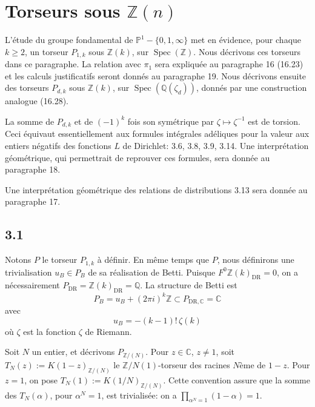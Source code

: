 \documentclass[12pt,a4paper]{article}
\theoremstyle{plain}
\theoremstyle{definition}
\theoremstyle{remark}
\DeclareMathOperator{\Spec}{Spec}
\providecommand{\Spec}{\operatorname{Spec}}
\providecommand{\DR}{\mathrm{DR}}
\begin{document}
\section{Torseurs sous $\mathbb{Z}(n)$}\label{sec:3}

L'\'etude du groupe fondamental de $\mathbb{P}^1 - \{0, 1, \infty\}$ met en \'evidence,
pour chaque $k \geq 2$, un torseur $P_{1,k}$ sous $\mathbb{Z}(k)$, sur
$\Spec(\mathbb{Z})$. Nous d\'ecrivons ces torseurs dans ce paragraphe. La relation avec
$\pi_1$ sera expliqu\'ee au paragraphe 16 (16.23) et les calculs justificatifs seront
donn\'es au paragraphe 19. Nous d\'ecrivons ensuite des torseurs $P_{d,k}$ sous
$\mathbb{Z}(k)$, sur $\Spec(\mathbb{Q}(\zeta_d))$, donn\'es par une construction analogue
(16.28).

La somme de $P_{d,k}$ et de $(-1)^k$ fois son sym\'etrique par $\zeta \mapsto \zeta^{-1}$
est de torsion. Ceci \'equivaut essentiellement aux formules int\'egrales ad\'eliques
pour la valeur aux entiers n\'egatifs des fonctions $L$ de Dirichlet: 3.6, 3.8, 3.9,
3.14. Une interpr\'etation g\'eom\'etrique, qui permettrait de reprouver ces formules,
sera donn\'ee au paragraphe 18.

Une interpr\'etation g\'eom\'etrique des relations de distributions 3.13 sera donn\'ee
au paragraphe 17.

\subsection*{3.1}

Notons $P$ le torseur $P_{1,k}$ \`a d\'efinir. En m\^eme temps que $P$, nous
d\'efinirons une trivialisation $u_B \in P_B$ de sa r\'ealisation de Betti. Puisque
$F^0 \mathbb{Z}(k)_{\DR} = 0$, on a n\'ecessairement $P_{\DR} = \mathbb{Z}(k)_{\DR} =
\mathbb{Q}$. La structure de Betti est
\begin{equation}\label{eq:3.1.1}
P_B = u_B + (2\pi i)^k \mathbb{Z} \subset P_{\DR,\mathbb{C}} = \mathbb{C}
\end{equation}
avec
\begin{equation*}
u_B = -(k-1)!\, \zeta(k)
\end{equation*}
o\`u $\zeta$ est la fonction $\zeta$ de Riemann.

Soit $N$ un entier, et d\'ecrivons $P_{\mathbb{Z}/(N)}$. Pour $z \in \mathbb{C}$,
$z \neq 1$, soit $T_N(z) := K(1-z)_{\mathbb{Z}/(N)}$ le $\mathbb{Z}/N(1)$-torseur des
racines $N$\`eme de $1-z$. Pour $z = 1$, on pose $T_N(1) :=
K(1/N)_{\mathbb{Z}/(N)}$. Cette convention assure que la somme des $T_N(\alpha)$, pour
$\alpha^N = 1$, est trivialis\'ee: on a $\prod_{\alpha^N=1} (1-\alpha) = 1$.
\end{document}
